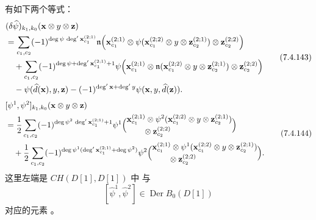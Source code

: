 有如下两个等式：
\begin{equation}
\begin{aligned}
&(\delta\widehat\psi)_{k_1,k_0}
(\mathbf x\otimes y\otimes\mathbf z)\\
&=
\sum_{c_1,c_2}
(-1)^{\deg\psi\,
\deg'\mathbf x_{c_1}^{(2;1)}}
\mathfrak n\Bigl(
\mathbf x_{c_1}^{(2;1)}
\otimes
\psi(\mathbf x_{c_1}^{(2;2)}
\otimes y\otimes\mathbf z_{c_2}^{(2;1)})
\otimes\mathbf z_{c_2}^{(2;2)}
\Bigr)\\
&\quad+
\sum_{c_1,c_2}
(-1)^{\deg\psi+
\deg'\mathbf x_{c_1}^{(2;1)}+1}
\psi\Bigl(
\mathbf x_{c_1}^{(2;1)}
\otimes
\mathfrak n(\mathbf x_{c_1}^{(2;2)}
\otimes y\otimes\mathbf z_{c_2}^{(2;1)})
\otimes\mathbf z_{c_2}^{(2;2)}
\Bigr)\\
&\quad-
\psi(\widehat d(\mathbf x),y,\mathbf z)
-(-1)^{\deg'\mathbf x+\deg' y}
\psi(\mathbf x,y,\widehat d(\mathbf z)).
\end{aligned}
\tag{7.4.143}\label{eq:7-4-143}
\end{equation}
\begin{equation}
\begin{aligned}
&[\psi^1,\psi^2]_{k_1,k_0}
(\mathbf x\otimes y\otimes\mathbf z)\\
&=
\frac12\sum_{c_1,c_2}
(-1)^{\deg\psi^2\,
\deg'\mathbf x_{c_1}^{(2;1)}+1}
\psi^1\Bigl(
\begin{aligned}
&\mathbf x_{c_1}^{(2;1)}
\otimes
\psi^2(\mathbf x_{c_1}^{(2;2)}
\otimes y\otimes\mathbf z_{c_2}^{(2;1)})\\[-.2em]
&\qquad{}\otimes\mathbf z_{c_2}^{(2;2)}
\end{aligned}
\Bigr)\\
&\quad+
\frac12\sum_{c_1,c_2}
(-1)^{\deg\psi^1(
\deg'\mathbf x_{c_1}^{(2;1)}+\deg\psi^2)}
\psi^2\Bigl(
\begin{aligned}
&\mathbf x_{c_1}^{(2;1)}
\otimes
\psi^1(\mathbf x_{c_1}^{(2;2)}
\otimes y\otimes\mathbf z_{c_2}^{(2;1)})\\[-.2em]
&\qquad{}\otimes\mathbf z_{c_2}^{(2;2)}
\end{aligned}
\Bigr).
\end{aligned}
\tag{7.4.144}\label{eq:7-4-144}
\end{equation}
这里左端是 $CH(D[1],D[1])$ 中
与
\[
[\widehat\psi^1,\widehat\psi^2]
\in\operatorname{Der}B_0(D[1])
\]
对应的元素
。

